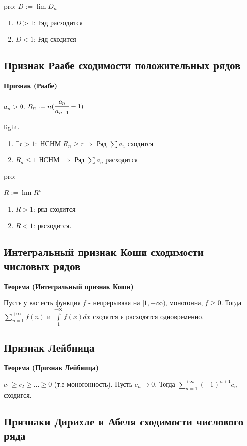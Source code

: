 \documentclass{article}
\newcommand{\integral}[2]{\displaystyle\int\limits_{#1}^{#2}}
\newcommand{\thmm}[1]{\underline{\textbf{#1}}}
\begin{document}
pro: $D:= \lim D_n$
\begin{enumerate}
    \item $D>1$: Ряд расходится
    \item $D<1$: Ряд сходится
\end{enumerate}

\subsection{Признак Раабе сходимости положительных рядов}

\thmm{Признак (Раабе)}

$a_n > 0$. $R_n := n(\cfrac{a_n}{a_{n+1}}-1)$

light:
\begin{enumerate}
    \item $\exists r>1:$ НСНМ $R_n \geq r \Rightarrow $ Ряд $\sum a_n$ сходится
    \item $R_n\leq 1$ НСНМ $\Rightarrow$ Ряд $\sum a_n$ расходится
\end{enumerate}
pro:

$R:= \lim R^n$
\begin{enumerate}
    \item $R>1$: ряд сходится
    \item $R<1$: расходится.
\end{enumerate}

\subsection{Интегральный признак Коши сходимости числовых рядов}

\thmm{Теорема (Интегральный признак Коши)}

Пусть у вас есть функция $f$ - непрерывная на $[1,+\infty)$, монотонна, $f\geq 0 $. Тогда $\sum\limits_{n=1}^{+\infty}f(n)$ и $\integral{1}{+\infty}f(x)dx$ сходятся и расходятся одновременно.

\subsection{Признак Лейбница}

\thmm{{Теорема (Признак Лейбница)}}

$c_1 \geq c_2 \geq \ldots \geq 0$ (т.е монотонность). Пусть $c_n \rightarrow 0 $. Тогда $\sum\limits_{n=1}^{+\infty} (-1)^{n+1} c_n$ - сходится.

\subsection{Признаки Дирихле и Абеля сходимости числового ряда}
\end{document}
